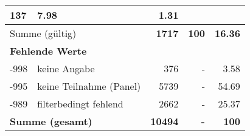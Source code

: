 \begin{longtable}{lXrrr}
       \num{137} &
       \num[round-mode=places,round-precision=2]{7,98} &
         \num[round-mode=places,round-precision=2]{1,31} \\
     \midrule
     \multicolumn{2}{l}{Summe (gültig)} &
       \textbf{\num{1717}} &
     \textbf{100} &
       \textbf{\num[round-mode=places,round-precision=2]{16,36}} \\
     \multicolumn{5}{l}{\textbf{Fehlende Werte}}\\
       -998 &
       keine Angabe &
         \num{376} &
        - &
         \num[round-mode=places,round-precision=2]{3,58} \\
       -995 &
       keine Teilnahme (Panel) &
         \num{5739} &
        - &
         \num[round-mode=places,round-precision=2]{54,69} \\
       -989 &
       filterbedingt fehlend &
         \num{2662} &
        - &
         \num[round-mode=places,round-precision=2]{25,37} \\
     \midrule
     \multicolumn{2}{l}{\textbf{Summe (gesamt)}} &
          \textbf{\num{10494}} &
        \textbf{-} &
        \textbf{100} \\
     \bottomrule
     \end{longtable}
     
